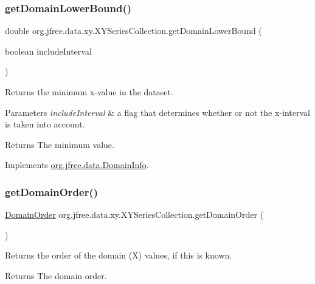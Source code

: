 \subsubsection{\texorpdfstring{get\+Domain\+Lower\+Bound()}{getDomainLowerBound()}}
{\footnotesize\ttfamily double org.\+jfree.\+data.\+xy.\+X\+Y\+Series\+Collection.\+get\+Domain\+Lower\+Bound (\begin{DoxyParamCaption}\item[{boolean}]{include\+Interval }\end{DoxyParamCaption})}

Returns the minimum x-\/value in the dataset.


\begin{DoxyParams}{Parameters}
{\em include\+Interval} & a flag that determines whether or not the x-\/interval is taken into account.\\
\hline
\end{DoxyParams}
\begin{DoxyReturn}{Returns}
The minimum value. 
\end{DoxyReturn}


Implements \mbox{\hyperlink{interfaceorg_1_1jfree_1_1data_1_1_domain_info_ae1b4d9d415fe0a79bd2ce0f6e0a3f489}{org.\+jfree.\+data.\+Domain\+Info}}.

\mbox{\label{classorg_1_1jfree_1_1data_1_1xy_1_1_x_y_series_collection_a4b80b66e0dc0f3aa894d151cf0507711}} 
\subsubsection{\texorpdfstring{get\+Domain\+Order()}{getDomainOrder()}}
{\footnotesize\ttfamily \mbox{\hyperlink{classorg_1_1jfree_1_1data_1_1_domain_order}{Domain\+Order}} org.\+jfree.\+data.\+xy.\+X\+Y\+Series\+Collection.\+get\+Domain\+Order (\begin{DoxyParamCaption}{ }\end{DoxyParamCaption})}

Returns the order of the domain (X) values, if this is known.

\begin{DoxyReturn}{Returns}
The domain order. 
\end{DoxyReturn}



